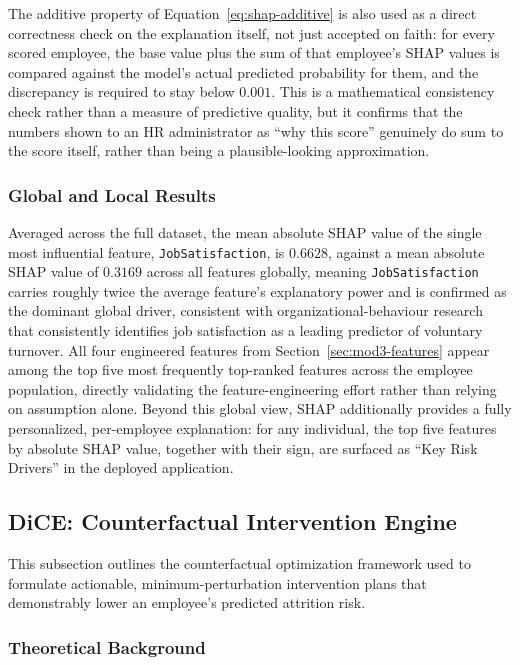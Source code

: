 \documentclass[11pt,a4paper]{article}
\newcommand{\code}[1]{\texttt{\footnotesize #1}}
\begin{document}
The additive property of Equation~\ref{eq:shap-additive} is also used as a direct correctness check on the explanation itself, not just accepted on faith: for every scored employee, the base value plus the sum of that employee's SHAP values is compared against the model's actual predicted probability for them, and the discrepancy is required to stay below $0.001$. This is a mathematical consistency check rather than a measure of predictive quality, but it confirms that the numbers shown to an HR administrator as ``why this score'' genuinely do sum to the score itself, rather than being a plausible-looking approximation.

\subsubsection{Global and Local Results}

Averaged across the full dataset, the mean absolute SHAP value of the single most influential feature, \code{JobSatisfaction}, is $0.6628$, against a mean absolute SHAP value of $0.3169$ across all features globally, meaning \code{JobSatisfaction} carries roughly twice the average feature's explanatory power and is confirmed as the dominant global driver, consistent with organizational-behaviour research that consistently identifies job satisfaction as a leading predictor of voluntary turnover. All four engineered features from Section~\ref{sec:mod3-features} appear among the top five most frequently top-ranked features across the employee population, directly validating the feature-engineering effort rather than relying on assumption alone. Beyond this global view, SHAP additionally provides a fully personalized, per-employee explanation: for any individual, the top five features by absolute SHAP value, together with their sign, are surfaced as ``Key Risk Drivers'' in the deployed application.

\subsection{DiCE: Counterfactual Intervention Engine}
\label{sec:mod3-dice}

This subsection outlines the counterfactual optimization framework used to formulate actionable, minimum-perturbation intervention plans that demonstrably lower an employee's predicted attrition risk.

\subsubsection{Theoretical Background}
\end{document}
